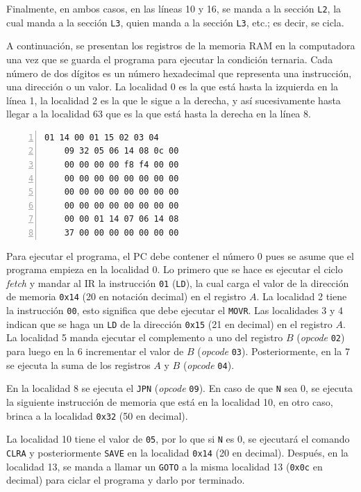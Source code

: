 \documentclass{article}
\begin{document}
Finalmente, en ambos casos, en las líneas 10 y 16, se manda a la sección \texttt{L2}, la cual manda a la sección \texttt{L3}, quien manda a la sección \texttt{L3}, etc.; es decir, se cicla. 

A continuación, se presentan los registros de la memoria RAM en la computadora una vez que se guarda el programa para ejecutar la condición ternaria. Cada número de dos dígitos es un número hexadecimal que representa una instrucción, una dirección o un valor. La localidad 0 es la que está hasta la izquierda en la línea 1, la localidad 2 es la que le sigue a la derecha, y así sucesivamente hasta llegar a la localidad 63 que es la que está hasta la derecha en la línea 8.

\begin{Verbatim}[numbers=left,xleftmargin=5mm]
    01 14 00 01 15 02 03 04
    09 32 05 06 14 08 0c 00
    00 00 00 00 f8 f4 00 00
    00 00 00 00 00 00 00 00
    00 00 00 00 00 00 00 00
    00 00 00 00 00 00 00 00
    00 00 01 14 07 06 14 08
    37 00 00 00 00 00 00 00
\end{Verbatim}

Para ejecutar el programa, el PC debe contener el número 0 pues se asume que el programa empieza en la localidad 0. Lo primero que se hace es ejecutar el ciclo \textit{fetch} y mandar al IR la instrucción \texttt{01} (\texttt{LD}), la cual carga el valor de la dirección de memoria \texttt{0x14} (20 en notación decimal) en el registro $A$. La localidad 2 tiene la instrucción \texttt{00}, esto significa que debe ejecutar el \texttt{MOVR}. Las localidades 3 y 4 indican que se haga un \texttt{LD} de la dirección \texttt{0x15} (21 en decimal) en el registro $A$. La localidad 5 manda ejecutar el complemento a uno del registro $B$ (\textit{opcode} \texttt{02}) para luego en la 6 incrementar el valor de $B$ (\textit{opcode} \texttt{03}). Posteriormente, en la 7 se ejecuta la suma de los registros $A$ y $B$ (\textit{opcode} \texttt{04}). 

En la localidad 8 se ejecuta el \texttt{JPN} (\textit{opcode} \texttt{09}). En caso de que \texttt{N} sea 0, se ejecuta la siguiente instrucción de memoria que está en la localidad 10, en otro caso, brinca a la localidad \texttt{0x32} (50 en decimal).

La localidad 10 tiene el valor de \texttt{05}, por lo que si \texttt{N} es 0, se ejecutará el comando \texttt{CLRA} y posteriormente \texttt{SAVE} en la localidad \texttt{0x14} (20 en decimal). Después, en la localidad 13, se manda a llamar un \texttt{GOTO} a la misma localidad 13 (\texttt{0x0c} en decimal) para ciclar el programa y darlo por terminado.
\end{document}
